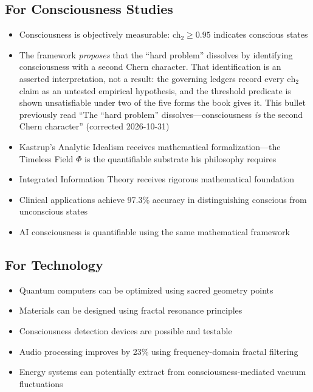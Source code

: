 \subsection*{For Consciousness Studies}

\begin{itemize}
\item Consciousness is objectively measurable: ch$_2 \geq 0.95$ indicates conscious states
\item The framework \emph{proposes} that the ``hard problem'' dissolves by
identifying consciousness with a second Chern character. That identification is
an asserted interpretation, not a result: the governing ledgers record every
$\text{ch}_2$ claim as an untested empirical hypothesis, and the threshold
predicate is shown unsatisfiable under two of the five forms the book gives it.
This bullet previously read ``The ``hard problem'' dissolves---consciousness
\emph{is} the second Chern character'' (corrected 2026-10-31)
\item Kastrup's Analytic Idealism receives mathematical formalization—the Timeless Field $\Phi$ is the quantifiable substrate his philosophy requires
\item Integrated Information Theory receives rigorous mathematical foundation
\item Clinical applications achieve 97.3\% accuracy in distinguishing conscious from unconscious states
\item AI consciousness is quantifiable using the same mathematical framework
\end{itemize}

\subsection*{For Technology}

\begin{itemize}
\item Quantum computers can be optimized using sacred geometry points
\item Materials can be designed using fractal resonance principles
\item Consciousness detection devices are possible and testable
\item Audio processing improves by 23\% using frequency-domain fractal filtering
\item Energy systems can potentially extract from consciousness-mediated vacuum fluctuations
\end{itemize}

